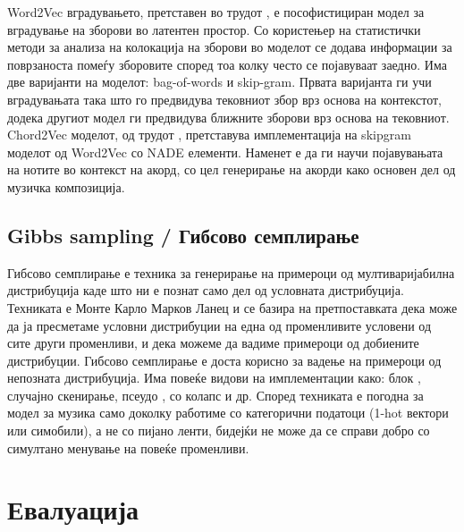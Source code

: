 Word2Vec вградувањето, претставен во трудот \cite{Mikolov2013}, е пософистициран модел за вградување на зборови во латентен простор. Со користењер на статистички методи за анализа на колокација на зборови во моделот се додава информации за поврзаноста помеѓу зборовите според тоа колку често се појавуваат заедно. Има две варијанти на моделот: bag-of-words и skip-gram. Првата варијанта ги учи вградувањата така што го предвидува тековниот збор врз основа на контекстот, додека другиот модел ги предвидува ближните зборови врз основа на тековниот. 
Chord2Vec моделот, од трудот \cite{Madjiheurem2016}, претставува имплементација на skipgram моделот од Word2Vec со NADE елементи. Наменет е да ги научи појавувањата на нотите во контекст на акорд, со цел генерирање на акорди како основен дел од музичка композиција. 

\section{Gibbs sampling / Гибсово семплирање}

Гибсово семплирање е техника за генерирање на примероци од мултиваријабилна дистрибуција каде што ни е познат само дел од условната дистрибуција. Техниката е Монте Карло Марков Ланец и се базира на претпоставката дека може да ја пресметаме условни дистрибуции на една од променливите условени од сите други променливи, и дека можеме да вадиме примероци од добиените дистрибуции. Гибсово семплирање е доста корисно за вадење на примероци од непозната дистрибуција. Има повеќе видови на имплементации како: блок \cite{Boulanger-Lewandowski2012, Goel2014}, случајно скенирање, псеудо \cite{Hadjeres2016}, со колапс и др. Според \cite{Hadjeres2016} техниката е погодна за модел за музика само доколку работиме со категорични податоци (1-hot вектори или симобили), а не со пијано ленти, бидејќи не може да се справи добро со симултано менување на повеќе променливи.

\chapter{Евалуација}
\label{ch:evaluacija}

